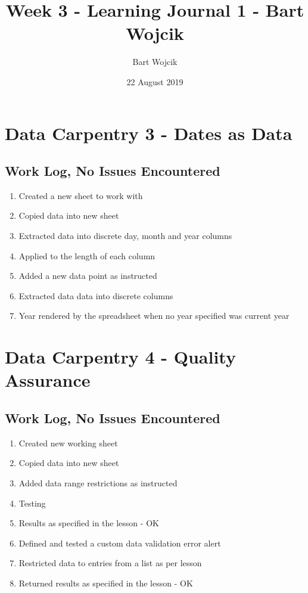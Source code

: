 \documentclass{article}
\title{Week 3 - Learning Journal 1  - Bart Wojcik}
\author{Bart Wojcik}
\date{22 August 2019}
\begin{document}
\maketitle

\section{Data Carpentry 3 - Dates as Data}
\subsection{Work Log, No Issues Encountered}
\begin{enumerate}
    \item Created a new sheet to work with
    \item Copied data into new sheet
    \item Extracted data into discrete day, month and year columns
    \item Applied to the length of each column
    \item Added a new data point as instructed
    \item Extracted data data into discrete columns
    \item Year rendered by the spreadsheet when no year specified was current year
\end{enumerate}

\section{Data Carpentry 4 - Quality Assurance}
\subsection{Work Log, No Issues Encountered}
\begin{enumerate}
    \item Created new working sheet
    \item Copied data into new sheet
    \item Added data range restrictions as instructed
    \item Testing
    \item Results as specified in the lesson - OK
    \item Defined and tested a custom data validation error alert
    \item Restricted data to entries from a list as per lesson
    \item Returned results as specified in the lesson - OK
\end{enumerate}
\end{document}
